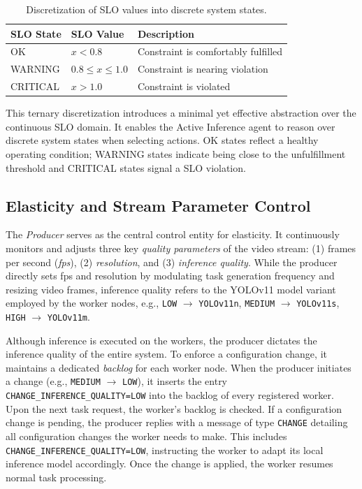 \begin{table}[h]
    \centering
    \begin{tabular}{@{}lll@{}}
        \toprule
        \textbf{SLO State} & \textbf{SLO Value} & \textbf{Description} \\
        \midrule
        OK        & \( x < 0.8 \)                          & Constraint is comfortably fulfilled \\
        WARNING   & \( 0.8 \leq x \leq 1.0 \)             & Constraint is nearing violation     \\
        CRITICAL  & \( x > 1.0 \)                         & Constraint is violated              \\
        \bottomrule
    \end{tabular}
    \caption{Discretization of SLO values into discrete system states.}
    \label{tab:slo-states}
\end{table}


This ternary discretization introduces a minimal yet effective abstraction over the continuous SLO domain. It enables the Active Inference agent to reason over discrete system states when selecting actions. OK states reflect a healthy operating condition; WARNING states indicate being close to the unfulfillment threshold and CRITICAL states signal a SLO violation.

\subsection{Elasticity and Stream Parameter Control}
The \textit{Producer} serves as the central control entity for elasticity. It continuously monitors and adjusts three key \textit{quality parameters} of the video stream: (1) frames per second (\textit{fps}), (2) \textit{resolution}, and (3) \textit{inference quality}. While the producer directly sets fps and resolution by modulating task generation frequency and resizing video frames, inference quality refers to the YOLOv11 model variant employed by the worker nodes, e.g., \texttt{LOW} $\rightarrow$ \texttt{YOLOv11n}, \texttt{MEDIUM} $\rightarrow$ \texttt{YOLOv11s}, \texttt{HIGH} $\rightarrow$ \texttt{YOLOv11m}.

Although inference is executed on the workers, the producer dictates the inference quality of the entire system. To enforce a configuration change, it maintains a dedicated \textit{backlog} for each worker node. When the producer initiates a change (e.g., \texttt{MEDIUM} $\rightarrow$ \texttt{LOW}), it inserts the entry \texttt{CHANGE\_INFERENCE\_QUALITY=LOW} into the backlog of every registered worker. Upon the next task request, the worker's backlog is checked. If a configuration change is pending, the producer replies with a message of type \texttt{CHANGE} detailing all configuration changes the worker needs to make. This includes \texttt{CHANGE\_INFERENCE\_QUALITY=LOW}, instructing the worker to adapt its local inference model accordingly. Once the change is applied, the worker resumes normal task processing.

